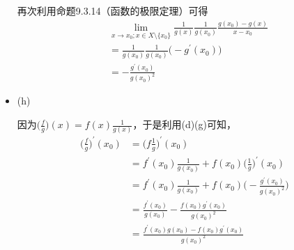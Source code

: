 \documentclass{article}
\begin{document}
\begin{itemize}
        再次利用命题9.3.14（函数的极限定理）可得
        \begin{align*}
           & \lim\limits_{x \to x_0; x \in X \setminus \{x_0\}} \frac{1}{g(x)} \frac{1}{g(x_0)} \frac{g(x_0) - g(x)}{x - x_0} \\
           & = \frac{1}{g(x_0)} \frac{1}{g(x_0)} \big( - g^\prime(x_0)\big)                                                   \\
           & = -\frac{g^\prime(x_0)}{g(x_0)^{2}}
        \end{align*}

  \item (h)

        因为$\big(\frac{f}{g}\big)(x) = f(x)\frac{1}{g(x)}$，于是利用(d)(g)可知，
        \begin{align*}
          \big(\frac{f}{g}\big)^\prime(x_0) & = \big(f\frac{1}{g}\big)^\prime(x_0)                                           \\
                                            & = f^\prime(x_0)\frac{1}{g(x_0)} + f(x_0)\big(\frac{1}{g}\big)^\prime(x_0)            \\
                                            & = f^\prime(x_0)\frac{1}{g(x_0)} + f(x_0) \big(-\frac{g^\prime(x_0)}{g(x_0)^{2}}\big) \\
                                            & = \frac{f^\prime(x_0)}{g(x_0)} - \frac{f(x_0) g^\prime(x_0)}{g(x_0)^{2}}             \\
                                            & = \frac{f^\prime(x_0) g(x_0) - f(x_0) g^\prime(x_0)}{g(x_0)^{2}}
        \end{align*}


\end{itemize}
\end{document}
